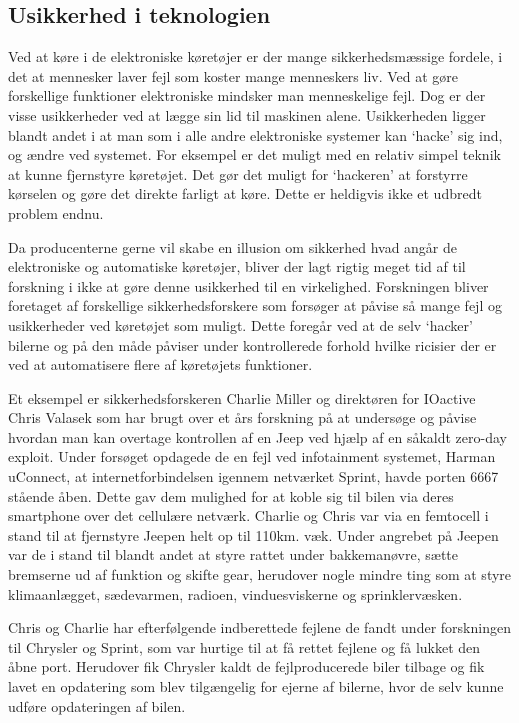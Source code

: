 \subsection{Usikkerhed i teknologien}
Ved at køre i de elektroniske køretøjer er der mange sikkerhedsmæssige fordele, i det at mennesker laver fejl som koster mange menneskers liv. Ved at gøre forskellige funktioner elektroniske mindsker man menneskelige fejl. Dog er der visse usikkerheder ved at lægge sin lid til maskinen alene. Usikkerheden ligger blandt andet i at man som i alle andre elektroniske systemer kan `hacke' sig ind, og ændre ved systemet. For eksempel er det muligt med en relativ simpel teknik at kunne fjernstyre køretøjet. Det gør det muligt for `hackeren' at forstyrre kørselen og gøre det direkte farligt at køre. Dette er heldigvis ikke et udbredt problem endnu.  

Da producenterne gerne vil skabe en illusion om sikkerhed hvad angår de elektroniske og automatiske køretøjer, bliver der lagt rigtig meget tid af til forskning i ikke at gøre denne usikkerhed til en virkelighed. Forskningen bliver foretaget af forskellige sikkerhedsforskere som forsøger at påvise så mange fejl og usikkerheder ved køretøjet som muligt. Dette foregår ved at de selv `hacker' bilerne og på den måde påviser under kontrollerede forhold hvilke ricisier der er ved at automatisere flere af køretøjets funktioner.  


Et eksempel er sikkerhedsforskeren Charlie Miller og direktøren for IOactive Chris Valasek som har brugt over et års forskning på at undersøge og påvise hvordan man kan overtage kontrollen af en Jeep ved hjælp af en såkaldt zero-day exploit. Under forsøget opdagede de en fejl ved infotainment systemet, Harman uConnect, at internetforbindelsen igennem netværket Sprint, havde porten 6667 stående åben. Dette gav dem mulighed for at koble sig til bilen via deres smartphone over det cellulære netværk. Charlie og Chris var via en femtocell i stand til at fjernstyre Jeepen helt op til 110km. væk. Under angrebet på Jeepen var de i stand til blandt andet at styre rattet under bakkemanøvre, sætte bremserne ud af funktion og skifte gear, herudover nogle mindre ting som at styre klimaanlægget, sædevarmen, radioen, vinduesviskerne og sprinklervæsken.  

Chris og Charlie har efterfølgende indberettede fejlene de fandt under forskningen til Chrysler og Sprint, som var hurtige til at få rettet fejlene og få lukket den åbne port. Herudover fik Chrysler kaldt de fejlproducerede biler tilbage og fik lavet en opdatering som blev tilgængelig for ejerne af bilerne, hvor de selv kunne udføre opdateringen af bilen.   

